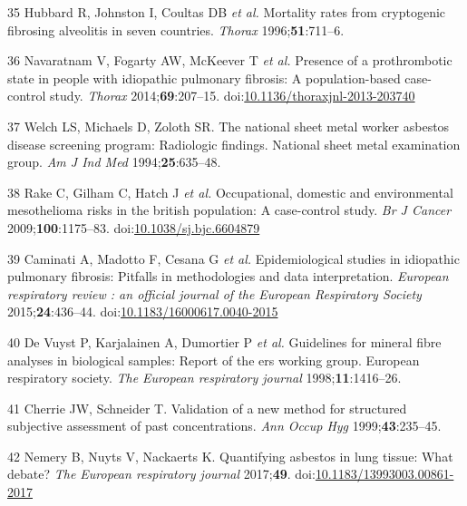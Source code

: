 \documentclass[12pt,a4paper,]{report}
\begin{document}
\leavevmode\hypertarget{ref-Hubbard1996}{}%
35 Hubbard R, Johnston I, Coultas DB \emph{et al.} Mortality rates from
cryptogenic fibrosing alveolitis in seven countries. \emph{Thorax}
1996;\textbf{51}:711--6.

\leavevmode\hypertarget{ref-Navaratnam2014}{}%
36 Navaratnam V, Fogarty AW, McKeever T \emph{et al.} Presence of a
prothrombotic state in people with idiopathic pulmonary fibrosis: A
population-based case-control study. \emph{Thorax}
2014;\textbf{69}:207--15.
doi:\href{https://doi.org/10.1136/thoraxjnl-2013-203740}{10.1136/thoraxjnl-2013-203740}

\leavevmode\hypertarget{ref-Welch1994}{}%
37 Welch LS, Michaels D, Zoloth SR. The national sheet metal worker
asbestos disease screening program: Radiologic findings. National sheet
metal examination group. \emph{Am J Ind Med} 1994;\textbf{25}:635--48.

\leavevmode\hypertarget{ref-Rake2009}{}%
38 Rake C, Gilham C, Hatch J \emph{et al.} Occupational, domestic and
environmental mesothelioma risks in the british population: A
case-control study. \emph{Br J Cancer} 2009;\textbf{100}:1175--83.
doi:\href{https://doi.org/10.1038/sj.bjc.6604879}{10.1038/sj.bjc.6604879}

\leavevmode\hypertarget{ref-Caminati2015}{}%
39 Caminati A, Madotto F, Cesana G \emph{et al.} Epidemiological studies
in idiopathic pulmonary fibrosis: Pitfalls in methodologies and data
interpretation. \emph{European respiratory review : an official journal
of the European Respiratory Society} 2015;\textbf{24}:436--44.
doi:\href{https://doi.org/10.1183/16000617.0040-2015}{10.1183/16000617.0040-2015}

\leavevmode\hypertarget{ref-DeVuyst1998}{}%
40 De Vuyst P, Karjalainen A, Dumortier P \emph{et al.} Guidelines for
mineral fibre analyses in biological samples: Report of the ers working
group. European respiratory society. \emph{The European respiratory
journal} 1998;\textbf{11}:1416--26.

\leavevmode\hypertarget{ref-Cherrie1999}{}%
41 Cherrie JW, Schneider T. Validation of a new method for structured
subjective assessment of past concentrations. \emph{Ann Occup Hyg}
1999;\textbf{43}:235--45.

\leavevmode\hypertarget{ref-Nemery2017}{}%
42 Nemery B, Nuyts V, Nackaerts K. Quantifying asbestos in lung tissue:
What debate? \emph{The European respiratory journal} 2017;\textbf{49}.
doi:\href{https://doi.org/10.1183/13993003.00861-2017}{10.1183/13993003.00861-2017}
\end{document}
